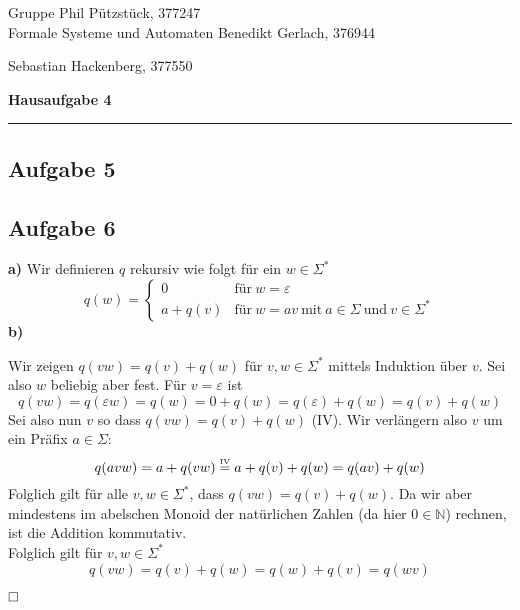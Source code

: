 \documentclass[a4paper,graphics,11pt]{article}
\newcommand{\aufgabe}[1]{\subsection*{Aufgabe #1}}
\newcommand{\up}[2]{\mathrel{\overset{\makebox[0pt]{\mbox{\normalfont\tiny #2}}}{#1}}}
\begin{document}
\noindent Gruppe              \hfill Phil Pützstück, 377247\\
\noindent Formale Systeme und Automaten \hfill Benedikt Gerlach, 376944\\
\strut\hfill Sebastian Hackenberg, 377550\\
\begin{center}
	\LARGE{\textbf{Hausaufgabe 4}}
\end{center}
\begin{center}
\rule[0.1ex]{\textwidth}{1pt}
\end{center}

\aufgabe{5}
\newpage
\aufgabe{6}
\textbf{a)}
Wir definieren $q$ rekursiv wie folgt für ein $w \in \Sigma^*$
$$
    q(w) = \begin{cases}
        0 & \text{für}\ w = \varepsilon\\
        a + q(v) & \text{für}\ w = av\ \text{mit}\ a \in \Sigma\ \text{und}\ v \in \Sigma^*
    \end{cases}
$$
\textbf{b)}

Wir zeigen $q(vw) = q(v) + q(w)$ für $v,w \in \Sigma^*$ mittels Induktion über $v$. Sei also $w$ beliebig aber fest.
Für $v = \varepsilon$ ist
$$
    q(vw)
    = q(\varepsilon w)
    = q(w)
    = 0 + q(w)
    = q(\varepsilon) + q(w)
    = q(v) + q(w)
$$
Sei also nun $v$ so dass $q(vw) = q(v) + q(w)$ (IV). Wir verlängern also $v$ um ein Präfix $a \in \Sigma$:
$$
    q(avw)
    = a + q(vw)
    \up{=}{IV} a + q(v) + q(w)
    = q(av) + q(w)
$$
Folglich gilt für alle $v,w \in \Sigma^*$, dass $q(vw) = q(v) + q(w)$. Da wir aber mindestens im abelschen
Monoid der natürlichen Zahlen (da hier $0 \in \mathbb{N}$) rechnen, ist die Addition kommutativ.\\
Folglich gilt für $v,w \in \Sigma^*$
$$
    q(vw)
    = q(v) + q(w)
    = q(w) + q(v)
    = q(wv)
$$
\strut$\hfill\square$
\end{document}
